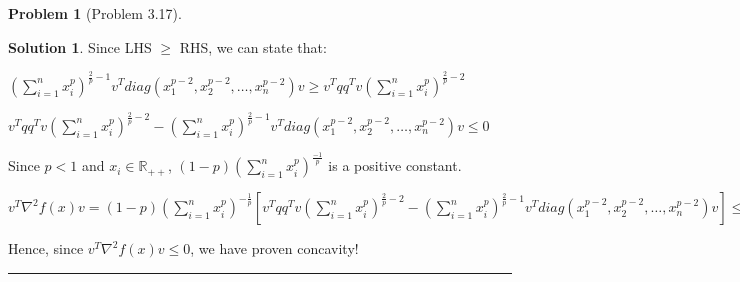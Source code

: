 \documentclass{article}
\theoremstyle{definition}
\newtheorem{problem}{Problem}
\def\fline{\rule{0.75\linewidth}{0.5pt}}
\newcommand{\finishline}{\begin{center}\fline\end{center}}
\newtheorem*{solution*}{Solution}
\newenvironment{solution}{\begin{solution*}}{{\finishline} \end{solution*}}
\begin{document}
\begin{problem} [Problem 3.17]
\begin{solution}
    Since LHS $\geq$ RHS, we can state that: \newline 

    $(\sum_{i=1}^{n} x_i^p)^{\frac{2}{p} - 1} v^T diag(x_1^{p - 2}, x_2^{p - 2}, \dots, x_n^{p - 2}) v \geq v^Tqq^Tv (\sum_{i=1}^{n} x_i^p)^{\frac{2}{p} - 2}$

    $v^Tqq^Tv (\sum_{i=1}^{n} x_i^p)^{\frac{2}{p} - 2} - (\sum_{i=1}^{n} x_i^p)^{\frac{2}{p} - 1} v^T diag(x_1^{p - 2}, x_2^{p - 2}, \dots, x_n^{p - 2}) v \leq 0$

    Since $p < 1$ and $x_i \in \mathbb{R}_{++}$, $(1 - p) (\sum_{i=1}^{n} x_i^p)^{\frac{-1}{p}}$ is a positive constant. \newline 

    $v^T \nabla^2f(x) v  = (1 - p) (\sum_{i=1}^{n} x_i^p)^{-\frac{1}{p}} [v^Tqq^Tv (\sum_{i=1}^{n} x_i^p)^{\frac{2}{p} - 2} - (\sum_{i=1}^{n} x_i^p)^{\frac{2}{p} - 1} v^T diag(x_1^{p - 2}, x_2^{p - 2}, \dots, x_n^{p - 2}) v] \leq 0$
    
    Hence, since $v^T \nabla^2f(x) v \leq 0$, we have proven concavity!
    
\end{solution}
\end{problem}
\end{document}
